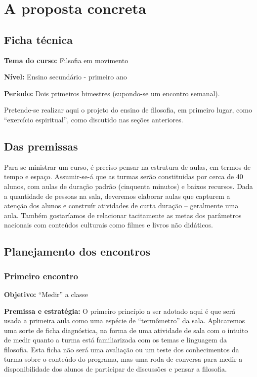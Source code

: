 \documentclass[12pt,a4paper]{article}
\begin{document}
	\newpage
	
	\section{A proposta concreta}
	
	\subsection{Ficha técnica}

	\textbf{Tema do curso:} Filsofia em movimento

	\textbf{Nível:} Ensino secundário - primeiro ano

	\textbf{Período:} Dois primeiros bimestres (supondo-se um encontro
	semanal). 

	Pretende-se realizar aqui o projeto do ensino de filosofia, em 
	primeiro lugar, como “exercício espiritual”, como discutido nas 
	seções anteriores. 

	\subsection{Das premissas}

	Para se ministrar um curso, é preciso pensar na 
	estrutura de aulas, em termos de tempo e espaço. Assumir-se-á que 
	as turmas serão constituidas por cerca de 40 alunos, com aulas de 
	duração padrão (cinquenta minutos) e baixos recursos. 
	Dada a quantidade de 
	pessoas na sala, deveremos elaborar aulas que capturem a atenção dos 
	alunos e construír atividades de curta duração -- geralmente uma aula.
	Também gostaríamos de relacionar tacitamente as metas dos parâmetros 
	nacionais com 	conteúdos culturais como filmes 
	e livros não didáticos. 

	\subsection{Planejamento dos encontros}

	\subsubsection{Primeiro encontro}

	\textbf{Objetivo:} “Medir” a classe

	\textbf{Premissa e estratégia:}
	O primeiro princípio a ser adotado aqui é que será usada a primeira aula 
	como uma espécie de ``termômetro'' da sala. Aplicaremos uma sorte de 
	ficha diagnóstica, na forma de uma atividade de sala com o intuito 
	de medir quanto a turma está familiarizada com os temas e linguagem 
	da filosofia. Esta ficha não será uma avaliação ou um teste dos 
	conhecimentos da turma sobre o conteúdo do programa, mas uma roda de 
	conversa para medir a disponibilidade dos alunos de participar de 
	discussões e pensar a filosofia. 
	
\end{document}
